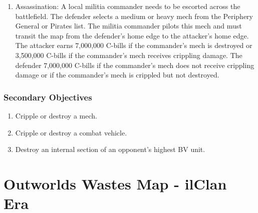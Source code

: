 \documentclass[UTF8]{article}
\begin{document}
\begin{enumerate}
\item Assassination: A local militia commander needs to be escorted across the battlefield.
The defender selects a medium or heavy mech from the Periphery General or Pirates list.
The militia commander pilots this mech and must transit the map from the defender's home edge to the attacker's home edge.
The attacker earns 7,000,000 C-bills if the commander's mech is destroyed or 3,500,000 C-bills if the commander's mech receives crippling damage.
The defender 7,000,000 C-bills if the commander's mech does not receive crippling damage or if the commander's mech is crippled but not destroyed.

\end{enumerate}

\subsubsection{Secondary Objectives}

\begin{enumerate}

\item Cripple or destroy a mech.

\item Cripple or destroy a combat vehicle.

\item Destroy an internal section of an opponent's highest BV unit.

\end{enumerate}

\newpage

\section{Outworlds Wastes Map - ilClan Era}

\begin{figure}[h!]
  \centering
\end{figure}
\end{document}
